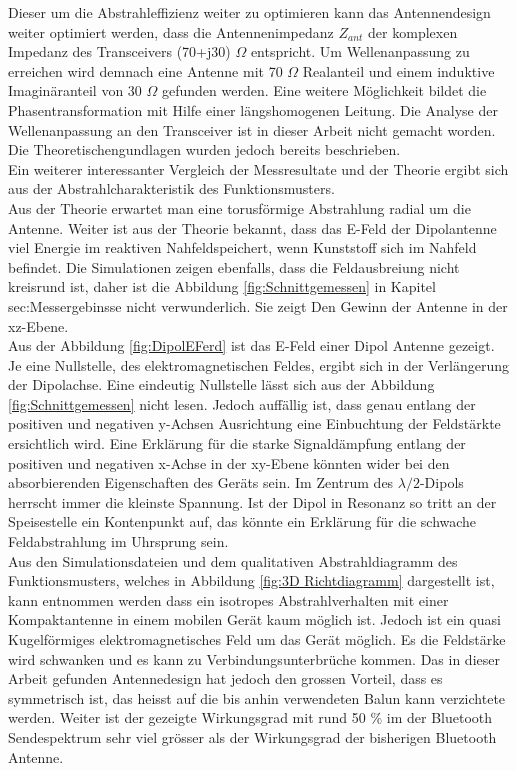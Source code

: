 Dieser um die Abstrahleffizienz weiter zu optimieren kann das Antennendesign weiter optimiert werden, dass die Antennenimpedanz $Z_{ant}$ der komplexen Impedanz des Transceivers (70+j30) $\Omega$ entspricht. Um Wellenanpassung zu erreichen wird demnach eine Antenne mit 70 $\Omega$ Realanteil und einem induktive Imaginäranteil von 30 $\Omega$ gefunden werden. Eine weitere Möglichkeit bildet die Phasentransformation mit Hilfe einer längshomogenen Leitung. Die Analyse der Wellenanpassung an den Transceiver ist in dieser Arbeit nicht gemacht worden. Die Theoretischengundlagen wurden jedoch bereits beschrieben. \\

Ein weiterer interessanter Vergleich der Messresultate und der Theorie ergibt sich aus der Abstrahlcharakteristik des Funktionsmusters.\\
Aus der Theorie erwartet man eine torusförmige Abstrahlung radial um die Antenne. Weiter ist aus der Theorie bekannt, dass das E-Feld der Dipolantenne viel Energie im reaktiven Nahfeldspeichert, wenn Kunststoff sich im Nahfeld befindet. Die Simulationen zeigen ebenfalls, dass die Feldausbreiung nicht kreisrund ist, daher ist die Abbildung \ref{fig:Schnittgemessen} in Kapitel {sec:Messergebinsse} nicht verwunderlich. Sie zeigt Den Gewinn der Antenne in der xz-Ebene.\\
Aus der Abbildung \ref{fig:DipolEFerd} ist das E-Feld einer Dipol Antenne gezeigt. Je eine Nullstelle, des elektromagnetischen Feldes, ergibt sich in der Verlängerung der Dipolachse. Eine eindeutig Nullstelle lässt sich aus der Abbildung \ref{fig:Schnittgemessen} nicht lesen. Jedoch auffällig ist, dass genau entlang der positiven und negativen y-Achsen Ausrichtung eine Einbuchtung der Feldstärkte ersichtlich wird. Eine Erklärung für die starke Signaldämpfung entlang der positiven und negativen x-Achse in der xy-Ebene könnten wider bei den absorbierenden Eigenschaften des Geräts sein. Im Zentrum des $\lambda/2$-Dipols herrscht immer die kleinste Spannung. Ist der Dipol in Resonanz so tritt an der Speisestelle ein Kontenpunkt auf, das könnte ein Erklärung für die schwache Feldabstrahlung im Uhrsprung sein.\\
Aus den Simulationsdateien und dem qualitativen Abstrahldiagramm des Funktionsmusters, welches in Abbildung \ref{fig:3D Richtdiagramm} dargestellt ist, kann entnommen werden dass ein isotropes Abstrahlverhalten mit einer Kompaktantenne in einem mobilen Gerät kaum möglich ist. Jedoch ist ein quasi Kugelförmiges elektromagnetisches Feld um das Gerät möglich. Es die Feldstärke wird schwanken und es kann zu Verbindungsunterbrüche kommen. Das in dieser Arbeit gefunden Antennedesign hat jedoch den grossen Vorteil, dass es symmetrisch ist, das heisst auf die bis anhin verwendeten Balun kann verzichtete  werden. Weiter ist der gezeigte Wirkungsgrad mit rund 50 $\%$ im der Bluetooth Sendespektrum sehr viel grösser als der Wirkungsgrad der bisherigen Bluetooth Antenne.\\

